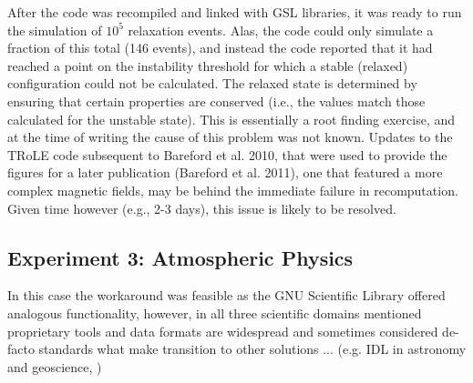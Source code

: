 After the code was recompiled and linked with GSL libraries, it was ready to run the simulation of $10^5$ relaxation
events. Alas, the code could only simulate a fraction of this total (146 events), and instead the code reported
that it had reached a point on the instability threshold for which a stable (relaxed) configuration could not be calculated.
The relaxed state is determined by ensuring that certain properties are conserved (i.e., the values match those
calculated for the unstable state). This is essentially a root finding exercise, and at the time of writing
the cause of this problem was not known. Updates to the TRoLE code subsequent to Bareford et al. 2010, that were
used to provide the figures for a later publication (Bareford et al. 2011), one that featured a more complex magnetic
fields, may be behind the immediate failure in recomputation. Given time however (e.g., 2-3 days), this issue
is likely to be resolved. 

\subsection*{Experiment 3: Atmospheric Physics}

In this case the workaround was feasible as the GNU Scientific Library offered analogous functionality, however, in all three scientific domains mentioned proprietary tools and data formats are widespread and sometimes considered de-facto standards what make transition to other solutions ... (e.g. IDL in astronomy and geoscience, )
